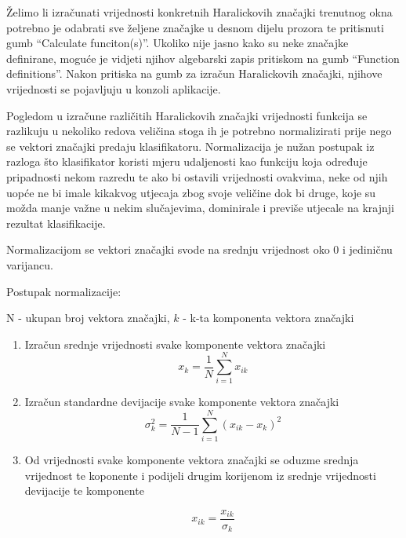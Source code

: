 \documentclass[times, utf8, zavrsni]{fer}
\begin{document}
\bigbreak

Želimo li izračunati vrijednosti konkretnih Haralickovih značajki 
trenutnog okna potrebno je odabrati sve željene značajke u desnom dijelu
prozora te pritisnuti gumb \enquote{Calculate funciton(s)}. Ukoliko
nije jasno kako su neke značajke definirane, moguće je vidjeti njihov
algebarski zapis pritiskom na gumb \enquote{Function definitions}. 
Nakon pritiska na gumb za izračun Haralickovih značajki, njihove vrijednosti
se pojavljuju u konzoli aplikacije. 

\bigbreak

Pogledom u izračune različitih Haralickovih značajki vrijednosti funkcija 
se razlikuju u nekoliko redova veličina stoga ih je potrebno normalizirati
prije nego se vektori značajki predaju klasifikatoru. Normalizacija
je nužan postupak iz razloga što klasifikator koristi mjeru udaljenosti
kao funkciju koja određuje pripadnosti nekom razredu te ako bi ostavili 
vrijednosti ovakvima, neke od njih uopće ne bi imale kikakvog utjecaja zbog 
svoje veličine dok bi druge, koje su možda manje važne u nekim slučajevima,
dominirale i previše utjecale na krajnji rezultat klasifikacije. 

\bigbreak

Normalizacijom se vektori značajki svode na srednju vrijednost oko 0
i jediničnu varijancu.

\bigbreak

Postupak normalizacije:
\begin{center}

N - ukupan broj vektora značajki, \(k\) - k-ta komponenta vektora značajki

\begin{enumerate}
\item Izračun srednje vrijednosti svake komponente vektora značajki
\[
x_k = \frac{1}{N}\sum_{i=1}^{N}x_{ik}
\]

\item Izračun standardne devijacije svake komponente vektora značajki
\[
\sigma_k^2 = \frac{1}{N-1}\sum_{i=1}^N\left(x_{ik}-x_k\right)^2
\]

\item Od vrijednosti svake komponente vektora značajki se oduzme srednja
vrijednost te koponente i podijeli drugim korijenom iz srednje vrijednosti
devijacije te komponente

\[
x_{ik} = \frac{x_{ik}}{\sigma_k}
\]

\end{enumerate}
\end{center}
\end{document}
